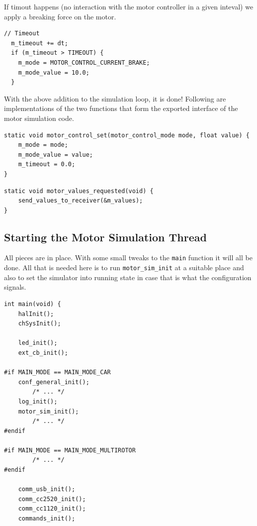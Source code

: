 \documentclass[12pt]{article} %
\begin{document}
{If timout happens (no interaction with the motor controller in a given inteval) we
apply a breaking force on the motor.

\begin{Verbatim}[samepage=true,frame=single,label=Embedded/RC\_Controller/motor\_sim.c]                        
  // Timeout
  m_timeout += dt;
  if (m_timeout > TIMEOUT) {
    m_mode = MOTOR_CONTROL_CURRENT_BRAKE;
    m_mode_value = 10.0;
  }
\end{Verbatim}                        

With the above addition to the simulation loop, it is done! Following
are implementations of the two functions that form the exported
interface of the motor simulation code.


\begin{Verbatim}[samepage=true,frame=single,label=Embedded/RC\_Controller/motor\_sim.c]
static void motor_control_set(motor_control_mode mode, float value) {
	m_mode = mode;
	m_mode_value = value;
	m_timeout = 0.0;
}
\end{Verbatim} 

\begin{Verbatim}[samepage=true,frame=single,label=Embedded/RC\_Controller/motor\_sim.c]
static void motor_values_requested(void) {
	send_values_to_receiver(&m_values);
}
\end{Verbatim}


\subsection{Starting the Motor Simulation Thread}

All pieces are in place. With some small tweaks to the \verb!main!
  function it will all be done. All that is needed here is to run
  \verb!motor_sim_init! at a suitable place and also to set the
  simulator into running state in case that is what the configuration
  signals.

\begin{Verbatim}[samepage=true,frame=single,label=Embedded/RC\_Controller/main.c]
int main(void) {
	halInit();
	chSysInit();

	led_init();
	ext_cb_init();

#if MAIN_MODE == MAIN_MODE_CAR
	conf_general_init();
        /* ... */
	log_init();
	motor_sim_init();
        /* ... */
#endif

#if MAIN_MODE == MAIN_MODE_MULTIROTOR
        /* ... */
#endif

	comm_usb_init();
	comm_cc2520_init();
	comm_cc1120_init();
	commands_init();


\end{Verbatim}}
\end{document}
